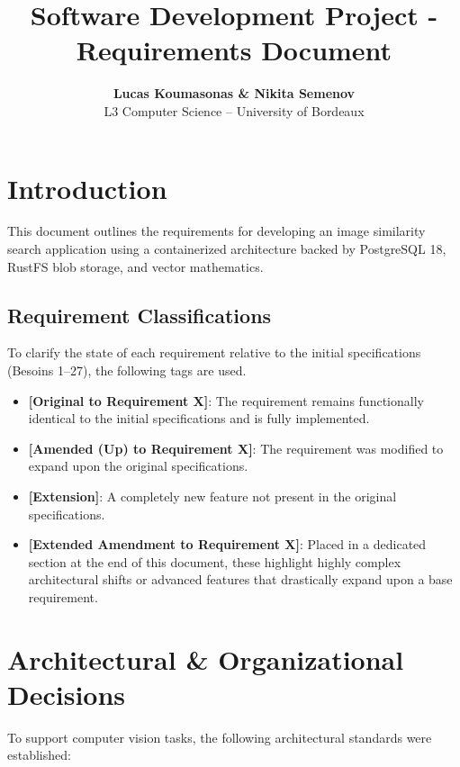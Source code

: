 \documentclass[12pt, a4paper]{article}
\begin{document}
\title{\textbf{Software Development Project - Requirements Document}}
\author{
    \textbf{Lucas Koumasonas \& Nikita Semenov} \\
    L3 Computer Science -- University of Bordeaux
}
\date{}
\maketitle

\section*{Introduction}
This document outlines the requirements for developing an image similarity search application using a containerized architecture backed by PostgreSQL 18, RustFS blob storage, and vector mathematics.

\subsection*{Requirement Classifications}
To clarify the state of each requirement relative to the initial specifications (Besoins 1--27), the following tags are used.

\begin{itemize}
    \item \textbf{[Original to Requirement X]}: The requirement remains functionally identical to the initial specifications and is fully implemented.
    \item \textbf{[Amended (Up) to Requirement X]}: The requirement was modified to expand upon the original specifications.
    \item \textbf{[Extension]}: A completely new feature not present in the original specifications.
    \item \textbf{[Extended Amendment to Requirement X]}: Placed in a dedicated section at the end of this document, these highlight highly complex architectural shifts or advanced features that drastically expand upon a base requirement.
\end{itemize}

\vspace{1em}
\noindent{}

\clearpage

\section{Architectural \& Organizational Decisions}
To support computer vision tasks, the following architectural standards were established:
\end{document}
